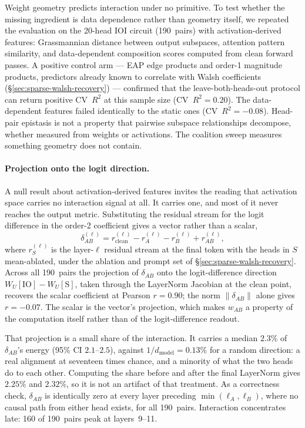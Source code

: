 \documentclass{article}
\begin{document}
Weight geometry predicts interaction under no primitive.
To test whether the missing ingredient is data dependence rather than geometry
itself, we repeated the evaluation on the 20-head IOI circuit (190~pairs) with
activation-derived features: Grassmannian distance between output subspaces,
attention pattern similarity, and data-dependent composition scores computed
from clean forward passes. A positive control arm --- EAP edge products and
order-1 magnitude products, predictors already known to correlate with Walsh
coefficients (\S\ref{sec:sparse-walsh-recovery}) --- confirmed that the
leave-both-heads-out protocol can return positive CV~$R^2$ at this sample size
(CV~$R^2 = 0.20$). The data-dependent features failed identically to the
static ones (CV~$R^2 = {-}0.08$). Head-pair epistasis is not a property that
pairwise subspace relationships decompose, whether measured from weights or
activations. The coalition sweep measures something geometry does not contain.

\paragraph{Projection onto the logit direction.}
A null result about activation-derived features invites the reading that activation
space carries no interaction signal at all. It carries one, and most of it never
reaches the output metric. Substituting the residual stream
for the logit difference in the order-2 coefficient gives a vector rather than a
scalar,
\begin{equation}
\delta_{AB}^{(\ell)}
  = r^{(\ell)}_{\text{clean}} - r^{(\ell)}_{A} - r^{(\ell)}_{B}
    + r^{(\ell)}_{AB},
\label{eq:delta-vector}
\end{equation}
where $r^{(\ell)}_{S}$ is the layer-$\ell$ residual stream at the final token with the
heads in $S$ mean-ablated, under the ablation and prompt set of
\S\ref{sec:sparse-walsh-recovery}. Across all 190~pairs the projection of $\delta_{AB}$ onto the logit-difference
direction $W_U[\text{IO}] - W_U[\text{S}]$, taken through the LayerNorm Jacobian at
the clean point, recovers the scalar coefficient at Pearson $r = 0.90$; the norm
$\lVert \delta_{AB} \rVert$ alone gives $r = {-}0.07$. The scalar is the vector's
projection, which makes $w_{AB}$ a property of the computation itself rather than of
the logit-difference readout.

That projection is a small share of the interaction. It carries a median $2.3\%$ of
$\delta_{AB}$'s energy (95\% CI $2.1$--$2.5$), against $1/d_{\text{model}} = 0.13\%$
for a random direction: a real alignment at seventeen times chance, and a minority of
what the two heads do to each other. Computing the share before and after the final
LayerNorm gives $2.25\%$ and $2.32\%$, so it is not an artifact of that treatment. As a correctness check, $\delta_{AB}$
is identically zero at every layer preceding $\min(\ell_A, \ell_B)$, where no causal
path from either head exists, for all 190~pairs. Interaction concentrates late: 160 of 190~pairs peak at layers~9--11.
\end{document}
